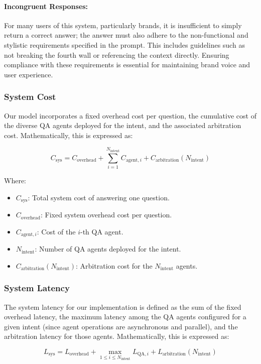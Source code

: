 \documentclass[sigconf,nonacm]{acmart}
\begin{document}
\paragraph{Incongruent Responses:} For many users of this system, particularly brands, it is insufficient to simply return a correct answer; the answer must also adhere to the non-functional and stylistic requirements specified in the prompt. This includes guidelines such as not breaking the fourth wall or referencing the context directly. Ensuring compliance with these requirements is essential for maintaining brand voice and user experience.

\subsubsection{System Cost}
Our model incorporates a fixed overhead cost per question, the cumulative cost of the diverse QA agents deployed for the intent, and the associated arbitration cost. Mathematically, this is expressed as:

\[
C_{\text{sys}} = C_{\text{overhead}} + \sum_{i=1}^{N_{\text{intent}}} C_{\text{agent}, i} + C_{\text{arbitration}}(N_{\text{intent}})
\]

Where:
\begin{itemize}
    \item \(C_{\text{sys}}\): Total system cost of answering one question.
    \item \(C_{\text{overhead}}\): Fixed system overhead cost per question.
    \item \(C_{\text{agent}, i}\): Cost of the \(i\)-th QA agent.
    \item \(N_{\text{intent}}\): Number of QA agents deployed for the intent.
    \item \(C_{\text{arbitration}}(N_{\text{intent}})\): Arbitration cost for the \(N_{\text{intent}}\) agents.
\end{itemize}

\subsubsection{System Latency}
The system latency for our implementation is defined as the sum of the fixed overhead latency, the maximum latency among the QA agents configured for a given intent (since agent operations are asynchronous and parallel), and the arbitration latency for those agents. Mathematically, this is expressed as:

\[
L_{\text{sys}} = L_{\text{overhead}} + \max_{1 \leq i \leq N_{\text{intent}}} L_{\text{QA}, i} + L_{\text{arbitration}}(N_{\text{intent}})
\]
\end{document}
